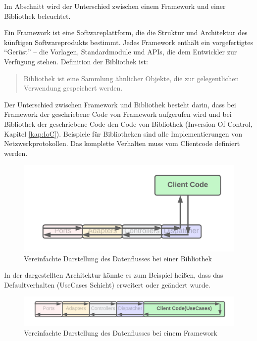 Im Abschnitt wird der Unterschied zwischen einem Framework und einer Bibliothek beleuchtet.

Ein Framework ist eine Softwareplattform, die die Struktur und Architektur des künftigen Softwareprodukts bestimmt.
Jedes Framework enthält ein vorgefertigtes “Gerüst” – die Vorlagen, Standardmodule und APIs, 
die dem Entwickler zur Verfügung stehen.
\footnotemark
{}
Definition der Bibliothek ist:
\begin{quote}
    Bibliothek ist eine Sammlung ähnlicher Objekte, die zur gelegentlichen Verwendung gespeichert werden.\footnotemark
\end{quote}

Der Unterschied zwischen Framework und Bibliothek besteht darin, 
dass bei Framework der geschriebene Code von Framework aufgerufen wird 
und bei Bibliothek der geschriebene Code den Code von Bibliothek  (Inversion Of Control, Kapitel \ref{kap:IoC}).
\footnotemark
{}
Beispiele für Bibliotheken sind alle Implementierungen von Netzwerkprotokollen.
Das komplette Verhalten muss vom Clientcode definiert werden.

\begin{figure}[H]
    \centering
    \includegraphics[width=1\textwidth]{./images/Dataflow Library.png}
    \caption{Vereinfachte Darstellung des Datenflusses bei einer Bibliothek}
    \label{fig:SimpliedDataflowLibrary}
\end{figure}

In der dargestellten Architektur könnte es zum Beispiel heißen, 
dass das Defaultverhalten (UseCases Schicht) erweitert oder geändert wurde.

\begin{figure}[H]
    \centering
    \includegraphics[width=1\textwidth]{./images/Dataflow Framework.png}
    \caption{Vereinfachte Darstellung des Datenflusses bei einem Framework}
    \label{fig:SimpliedDataflowFramework}
\end{figure}

